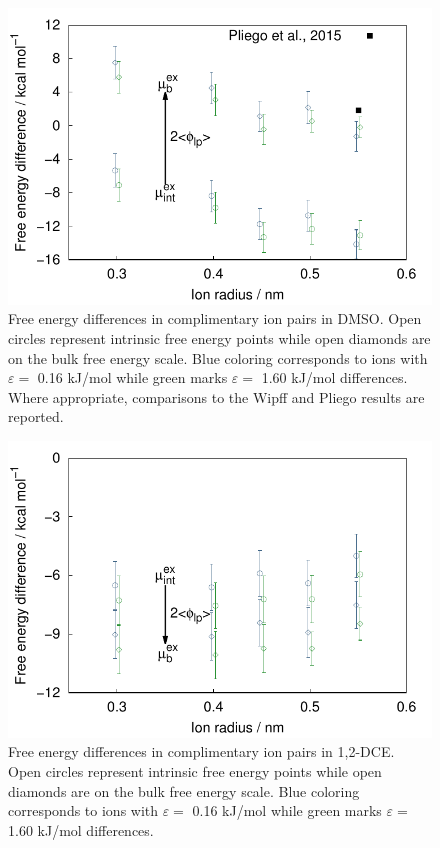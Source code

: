 \begin{tatb}
\begin{figure} 
 \includegraphics[width=0.98\linewidth]{images/tatb/dmso_free_energy.pdf}
 \caption[Free energy differences in dimethyl sulfoxide]{\label{fig:uex_diffs2}Free energy differences in complimentary ion pairs in DMSO. Open circles 
 represent intrinsic free energy points while open diamonds are on the bulk free energy scale. Blue coloring corresponds to ions with $\varepsilon =$ 0.16 
 kJ/mol while green marks $\varepsilon =$ 1.60 kJ/mol differences. Where appropriate, comparisons to the Wipff and Pliego results are reported.}
\end{figure}

\begin{figure} 
 \includegraphics[width=0.98\linewidth]{images/tatb/dce_free_energy.pdf}
 \caption[Free energy differences in 1,2-dichloroethane]{\label{fig:uex_diffs3}Free energy differences in complimentary ion pairs in 1,2-DCE. Open circles 
 represent intrinsic free energy points while open diamonds are on the bulk free energy scale. Blue coloring corresponds to ions with $\varepsilon =$ 0.16 
 kJ/mol while green marks $\varepsilon =$ 1.60 kJ/mol differences.}
\end{figure}


\end{tatb}
